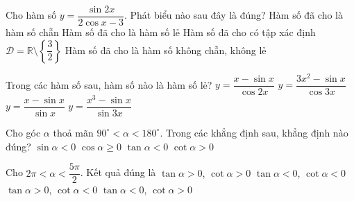 \begin{ex}[c]%
	 Cho hàm số $y=\dfrac{\sin2x}{2\cos x-3}$. Phát biểu nào sau đây là đúng?
	 \choice
		{Hàm số  đã cho là hàm số chẵn}
		{\True  Hàm số đã cho là hàm số lẻ}
		{Hàm số đã cho có  tập xác định $\mathscr{D}=\mathbb{R}\setminus\left\{\dfrac{3}{2}\right\}$}
		{Hàm số đã cho là hàm số không chẵn, không lẻ} 
\end{ex}

\begin{ex}[c]%
	Trong các hàm số sau, hàm số nào là hàm  số lẻ?
	\choice 
		 {\True $y=\dfrac{x-\sin x}{\cos 2x}$}
		{$y=\dfrac{3x^2-\sin x}{\cos  3x}$}
		{$y=\dfrac{x-\sin  x}{\sin x}$}
		{$y=\dfrac{x^3-\sin x}{\sin  3x}$}
\end{ex}

\begin{ex}%
	Cho góc $\alpha $ thoả mãn $90^\circ <\alpha <180^\circ $.  Trong các khẳng định sau, khẳng định nào đúng?
	\choice 
		{$\sin \alpha <0$} 
		{$\cos\alpha \ge  0$}
		{\True $\tan \alpha <0$} 
		{$\cot\alpha  >0$}
\end{ex}

\begin{ex}%
	Cho $2\pi <\alpha <\dfrac{5\pi}{2}$. Kết quả đúng  là
	 \choice
		{\True $\tan \alpha >0$, $\cot \alpha  >0$}
		 {$\tan \alpha <0$, $\cot \alpha <0$}
		{$\tan \alpha >0$, $\cot \alpha <0$} 
		{$\tan  \alpha <0$, $\cot \alpha >0$}
\end{ex}

